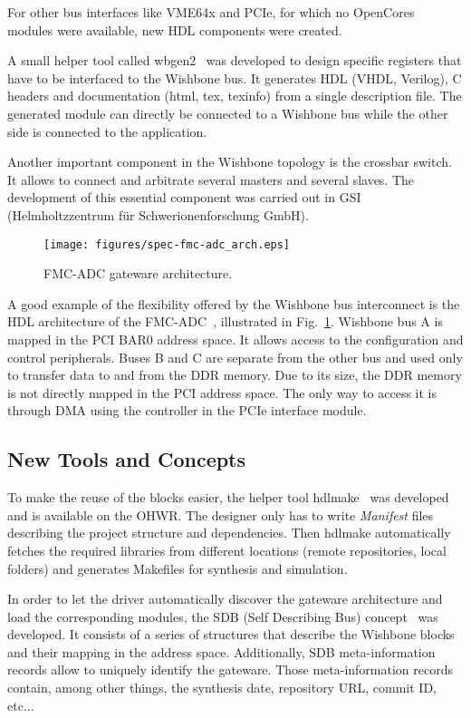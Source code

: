 \documentclass{JAC2003}
\begin{document}
For other bus interfaces like VME64x and PCIe, for which no OpenCores modules were available, new HDL components were created.

A small helper tool called wbgen2~\cite{wbgen2} was developed to design specific registers that have to be interfaced to the Wishbone bus.
It generates HDL (VHDL, Verilog), C headers and documentation (html, tex, texinfo) from a single description file.
The generated module can directly be connected to a Wishbone bus while the other side is connected to the application.

Another important component in the Wishbone topology is the crossbar switch.
It allows to connect and arbitrate several masters and several slaves.
The development of this essential component was carried out in GSI (Helmholtzzentrum f\"ur Schwerionenforschung GmbH).

\begin{figure}[htb]
   \centering
   \texttt{[image: figures/spec-fmc-adc\_arch.eps]}
   \caption{FMC-ADC gateware architecture.}
   \label{spec-fmc-adc_arch}
\end{figure}

A good example of the flexibility offered by the Wishbone bus interconnect is the HDL architecture of the FMC-ADC~\cite{fmc-adc}, illustrated in Fig.~\ref{spec-fmc-adc_arch}.
Wishbone bus A is mapped in the PCI BAR0 address space.
It allows access to the configuration and control peripherals.
Buses B and C are separate from the other bus and used only to transfer data to and from the DDR memory.
Due to its size, the DDR memory is not directly mapped in the PCI address space.
The only way to access it is through DMA using the controller in the PCIe interface module.

\subsection{New Tools and Concepts}
To make the reuse of the blocks easier, the helper tool hdlmake~\cite{hdlmake} was developed and is available on the OHWR.
The designer only has to write \textit{Manifest} files describing the project structure and dependencies.
Then hdlmake automatically fetches the required libraries from different locations (remote repositories, local folders) and generates Makefiles for synthesis and simulation.

In order to let the driver automatically discover the gateware architecture and load the corresponding modules, the SDB (Self Describing Bus) concept~\cite{sdb} was developed.
It consists of a series of structures that describe the Wishbone blocks and their mapping in the address space.
Additionally, SDB meta-information records allow to uniquely identify the gateware.
Those meta-information records contain, among other things, the synthesis date, repository URL, commit ID, etc...
\end{document}
